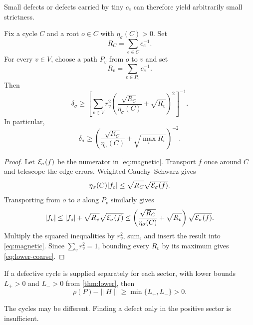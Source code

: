Small defects or defects carried by tiny \(c_e\) can therefore yield
arbitrarily small strictness.

\begin{theorem}\label{thm:lower}
Fix a cycle \(C\) and a root \(o\in C\) with
\(\eta_\sigma(C)>0\).  Set
\[
 R_C=\sum_{e\in C}c_e^{-1}.
\]
For every \(v\in V\), choose a path \(P_v\) from \(o\) to \(v\) and set
\[
 R_v=\sum_{e\in P_v}c_e^{-1}.
\]
Then
\begin{equation}\label{eq:lower}
\boxed{\displaystyle
 \delta_\sigma
 \ge
 \left[
 \sum_{v\in V}r_v^2
 \left(
 \frac{\sqrt{R_C}}{\eta_\sigma(C)}
 +\sqrt{R_v}
 \right)^2
 \right]^{-1}.}
\end{equation}
In particular,
\begin{equation}\label{eq:lower-coarse}
 \delta_\sigma
 \ge
 \left(
 \frac{\sqrt{R_C}}{\eta_\sigma(C)}
 +\sqrt{\max_vR_v}
 \right)^{-2}.
\end{equation}
\end{theorem}

\begin{proof}
Let \(\mathcal E_\sigma(f)\) be the numerator in
\eqref{eq:magnetic}.  Transport \(f\) once around \(C\) and telescope
the edge errors.  Weighted Cauchy--Schwarz gives
\[
 \eta_\sigma(C)|f_o|
 \le \sqrt{R_C}\sqrt{\mathcal E_\sigma(f)}.
\]
Transporting from \(o\) to \(v\) along \(P_v\) similarly gives
\[
 |f_v|
 \le |f_o|+\sqrt{R_v}\sqrt{\mathcal E_\sigma(f)}
 \le
 \left(
 \frac{\sqrt{R_C}}{\eta_\sigma(C)}
 +\sqrt{R_v}
 \right)\sqrt{\mathcal E_\sigma(f)}.
\]
Multiply the squared inequalities by \(r_v^2\), sum, and insert the
result into \eqref{eq:magnetic}.  Since \(\sum_vr_v^2=1\), bounding
every \(R_v\) by its maximum gives \eqref{eq:lower-coarse}.
\end{proof}

\begin{corollary}\label{cor:both-sectors}
If a defective cycle is supplied separately for each sector, with
lower bounds \(L_+>0\) and \(L_->0\) from \cref{thm:lower}, then
\[
 \rho(P)-\|H\|
 \ge\min\{L_+,L_-\}>0.
\]
\end{corollary}

The cycles may be different.  Finding a defect only in the positive
sector is insufficient.
